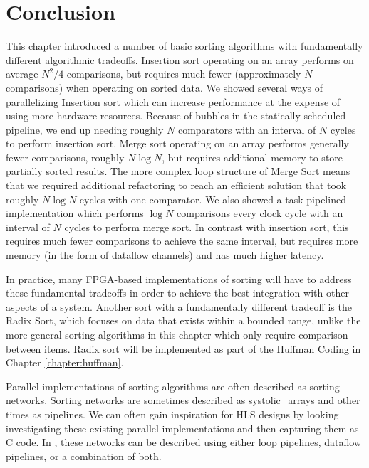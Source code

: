 \section{Conclusion}

This chapter introduced a number of basic sorting algorithms with fundamentally different algorithmic tradeoffs.  Insertion sort operating on an array performs on average $N^2/4$ comparisons, but requires much fewer (approximately $N$ comparisons) when operating on sorted data. We showed several ways of parallelizing Insertion sort which can increase performance at the expense of using more hardware resources.  Because of bubbles in the statically scheduled pipeline, we end up needing roughly $N$ comparators with an interval of $N$ cycles to perform insertion sort.  Merge sort operating on an array performs generally fewer comparisons, roughly $N \log N$, but requires additional memory to store partially sorted results.  The more complex loop structure of Merge Sort means that we required additional refactoring to reach an efficient solution that took roughly $N \log N$ cycles with one comparator.  We also showed a task-pipelined implementation which performs $\log N$ comparisons every clock cycle with an interval of $N$ cycles to perform merge sort.  In contrast with insertion sort, this requires much fewer comparisons to achieve the same interval, but requires more memory (in the form of dataflow channels) and has much higher latency.

In practice, many FPGA-based implementations of sorting will have to address these fundamental tradeoffs in order to achieve the best integration with other aspects of a system. Another sort with a fundamentally different tradeoff is the Radix Sort, which focuses on data that exists within a bounded range, unlike the more general sorting algorithms in this chapter which only require comparison between items.  Radix sort will be implemented as part of the Huffman Coding in Chapter \ref{chapter:huffman}.

Parallel implementations of sorting algorithms are often described as sorting networks.  Sorting networks are sometimes described as \glspl{systolic_array} and other times as pipelines.  We can often gain inspiration for HLS designs by looking investigating these existing parallel implementations and then capturing them as C code.  In \VHLS, these networks can be described using either loop pipelines, dataflow pipelines, or a combination of both.
 
